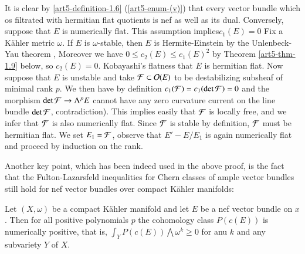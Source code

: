 \begin{sketch of proof}
It is clear by \ref{art5-definition-1.6} (\ref{art5-enum-(v)}) that every vector bundle which os filtrated with hermitian flat quotients is nef as well as its dual. Conversely, suppose that $E$ is numerically flat. This assumption implies$c_{1}(E) = 0$ Fix a K\"ahler metric $\omega$. If $E$ is $\omega$-stable, then $E$ is Hermite-Einstein by the Unlenbeck-Yau theorem \cite{art5-keyUY86}, Moreover we have $0 \leq c_{2}(E) \leq c_{1}(E)^{2}$ by Theorem \ref{art5-thm-1.9} below, so $c_{2}(E) = 0$. Kobayashi's flatness that $E$ is hermitian flat. Now suppose that $E$ is unstable and take $\mathcal{F} \subset\mathcal{O}(E)$ to be destabilizing subsheaf of minimal rank $p$. We then have by definition $c_{1}(\mathcal{F}) = c_{1}(\det \mathcal{F}) = 0$ and the morphism $\det\mathcal{F} \rightarrow \Lambda^{p}E$ cannot have any zero curvature current on the line bundle $\det \mathcal{F}$, contradiction). This implies easily that $\mathcal{F}$ is locally free, and we infer that $\mathcal{F}$ is also numerically flat. Since $\mathcal{F}$ is stable by definition, $\mathcal{F}$ must be hermitian flat. We set $E_{1} = \mathcal{F}$, observe that $E' - E/E_{1}$ is again numerically flat and proceed by induction on the rank.
\end{sketch of proof}

Another key point, which has been indeed used in the above proof, is the fact that the Fulton-Lazarsfeld inequalities \cite{FL83} for Chern classes of ample vector bundles still hold for nef vector bundles over compact K\"ahler manifolds:

\begin{theorem}\label{art5-thm-1.9}
Let $(X, \omega)$ be a compact K\"ahler manifold and let $E$ be a nef vector bundle on $x$. Then for all positive polynomials $p$ the cohomology class $P(c(E))$ is numerically positive, that is, $\int_{Y}P(c(E)) \bigwedge \omega^{k} \geq 0$ for anu $k$ and any subvariety $Y$ of $X$.
\end{theorem}

